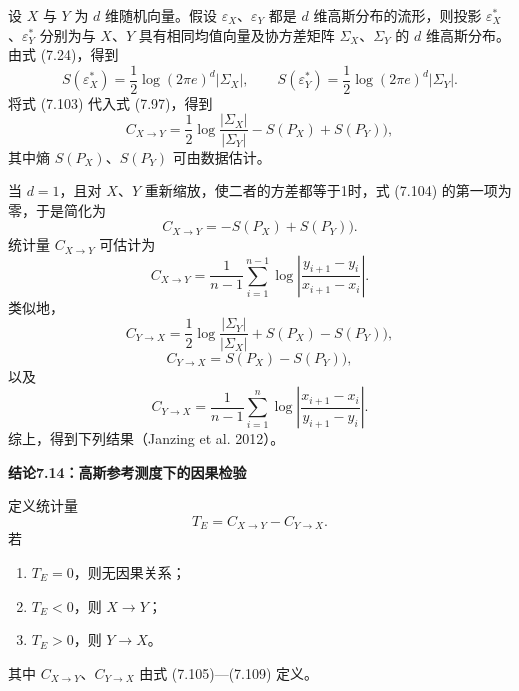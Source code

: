 设 $X$ 与 $Y$ 为 $d$ 维随机向量。假设 $\varepsilon_X$、$\varepsilon_Y$ 都是 $d$ 维高斯分布的流形，则投影 $\varepsilon_X^*$、$\varepsilon_Y^*$ 分别为与 $X$、$Y$ 具有相同均值向量及协方差矩阵 $\Sigma_X$、$\Sigma_Y$ 的 $d$ 维高斯分布。由式 (7.24)，得到
\begin{equation}
S(\varepsilon_X^*)=\frac12\log(2\pi e)^d|\Sigma_X|,\qquad
S(\varepsilon_Y^*)=\frac12\log(2\pi e)^d|\Sigma_Y|.
\tag{7.103}
\end{equation}
将式 (7.103) 代入式 (7.97)，得到
\begin{equation}
C_{X\to Y}=\frac12\log\frac{|\Sigma_X|}{|\Sigma_Y|}-S(P_X)+S(P_Y)),
\tag{7.104}
\end{equation}
其中熵 $S(P_X)$、$S(P_Y)$ 可由数据估计。

当 $d=1$，且对 $X$、$Y$ 重新缩放，使二者的方差都等于1时，式 (7.104) 的第一项为零，于是简化为
\begin{equation}
C_{X\to Y}=-S(P_X)+S(P_Y)).
\tag{7.105}
\end{equation}
统计量 $C_{X\to Y}$ 可估计为
\begin{equation}
C_{X\to Y}=\frac1{n-1}\sum_{i=1}^{n-1}\log\left|\frac{y_{i+1}-y_i}{x_{i+1}-x_i}\right|.
\tag{7.106}
\end{equation}
类似地，
\begin{equation}
C_{Y\to X}=\frac12\log\frac{|\Sigma_Y|}{|\Sigma_X|}+S(P_X)-S(P_Y)),
\tag{7.107}
\end{equation}
\begin{equation}
C_{Y\to X}=S(P_X)-S(P_Y)),
\tag{7.108}
\end{equation}
以及
\begin{equation}
C_{Y\to X}=\frac1{n-1}\sum_{i=1}^{n}\log\left|\frac{x_{i+1}-x_i}{y_{i+1}-y_i}\right|.
\tag{7.109}
\end{equation}
综上，得到下列结果（Janzing et al. 2012）。

\par\medskip{}\noindent\textbf{结论7.14：高斯参考测度下的因果检验}\par
定义统计量
\begin{equation}
T_E=C_{X\to Y}-C_{Y\to X}.
\tag{7.110}
\end{equation}
若
\begin{enumerate}[start=4]
\item $T_E=0$，则无因果关系；
\item $T_E<0$，则 $X\to Y$；
\item $T_E>0$，则 $Y\to X$。
\end{enumerate}
其中 $C_{X\to Y}$、$C_{Y\to X}$ 由式 (7.105)—(7.109) 定义。
